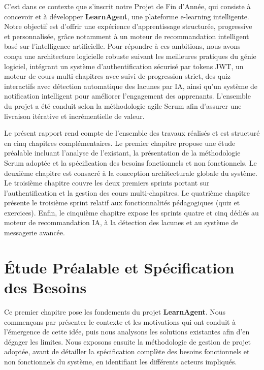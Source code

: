 \documentclass[12pt,a4paper]{report}
\begin{document}
C'est dans ce contexte que s'inscrit notre Projet de Fin d'Année, qui consiste à concevoir et à développer \textbf{LearnAgent}, une plateforme e-learning intelligente. Notre objectif est d'offrir une expérience d'apprentissage structurée, progressive et personnalisée, grâce notamment à un moteur de recommandation intelligent basé sur l'intelligence artificielle. Pour répondre à ces ambitions, nous avons conçu une architecture logicielle robuste suivant les meilleures pratiques du génie logiciel, intégrant un système d'authentification sécurisé par tokens JWT, un moteur de cours multi-chapitres avec suivi de progression strict, des quiz interactifs avec détection automatique des lacunes par IA, ainsi qu'un système de notification intelligent pour améliorer l'engagement des apprenants. L'ensemble du projet a été conduit selon la méthodologie agile Scrum afin d'assurer une livraison itérative et incrémentielle de valeur.

Le présent rapport rend compte de l'ensemble des travaux réalisés et est structuré en cinq chapitres complémentaires. Le premier chapitre propose une étude préalable incluant l'analyse de l'existant, la présentation de la méthodologie Scrum adoptée et la spécification des besoins fonctionnels et non fonctionnels. Le deuxième chapitre est consacré à la conception architecturale globale du système. Le troisième chapitre couvre les deux premiers sprints portant sur l'authentification et la gestion des cours multi-chapitres. Le quatrième chapitre présente le troisième sprint relatif aux fonctionnalités pédagogiques (quiz et exercices). Enfin, le cinquième chapitre expose les sprints quatre et cinq dédiés au moteur de recommandation IA, à la détection des lacunes et au système de messagerie avancée.

\newpage

\chapter{Étude Préalable et Spécification des Besoins}

Ce premier chapitre pose les fondements du projet \textbf{LearnAgent}. Nous commençons par présenter le contexte et les motivations qui ont conduit à l'émergence de cette idée, puis nous analysons les solutions existantes afin d'en dégager les limites. Nous exposons ensuite la méthodologie de gestion de projet adoptée, avant de détailler la spécification complète des besoins fonctionnels et non fonctionnels du système, en identifiant les différents acteurs impliqués.
\end{document}
